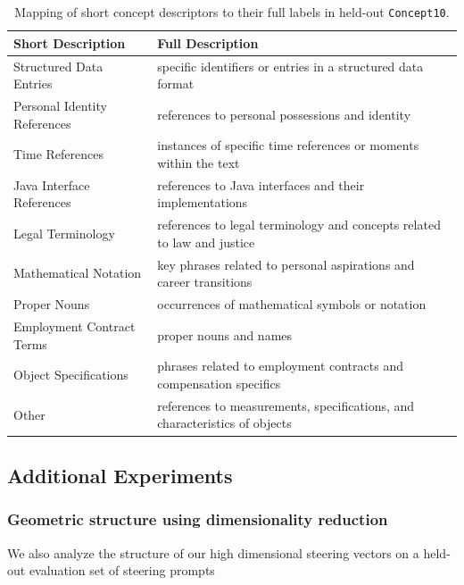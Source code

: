 \documentclass[11pt]{article}
\begin{document}
\begin{table}[t]
  \centering
  \small
  \begin{tabularx}{\columnwidth}{@{}lX@{}}
    \toprule
    \textbf{Short Description} & \textbf{Full Description} \\
    \midrule
    Structured Data Entries        & specific identifiers or entries in a structured data format \\
    Personal Identity References   & references to personal possessions and identity \\
    Time References                & instances of specific time references or moments within the text \\
    Java Interface References      & references to Java interfaces and their implementations \\
    Legal Terminology              & references to legal terminology and concepts related to law and justice \\
    Mathematical Notation          & key phrases related to personal aspirations and career transitions \\
    Proper Nouns                   & occurrences of mathematical symbols or notation \\
    Employment Contract Terms      & proper nouns and names \\
    Object Specifications          & phrases related to employment contracts and compensation specifics \\
    Other                          & references to measurements, specifications, and characteristics of objects \\
    \bottomrule
  \end{tabularx}
  \caption{Mapping of short concept descriptors to their full labels in held-out \texttt{Concept10}.}
  \label{tab:new-desc-mapping}
\end{table}


\subsection{Additional Experiments}

\subsubsection{Geometric structure using dimensionality reduction}
\label{appendix:geom-structure}

We also analyze the structure of our high dimensional steering vectors on a held-out evaluation set of steering prompts 
\end{document}
